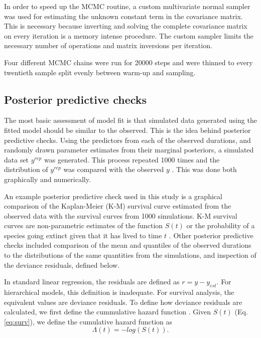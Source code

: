\documentclass[12pt,letterpaper]{article}
\begin{document}
In order to speed up the MCMC routine, a custom multivariate normal sampler was used for estimating the unknown constant term in the covariance matrix. This is necessary because inverting and solving the complete covariance matrix on every iteration is a memory intense procedure. The custom sampler limits the necessary number of operations and matrix inversions per iteration.

Four different MCMC chains were run for 20000 steps and were thinned to every twentieth sample split evenly between warm-up and sampling. 



\subsection{Posterior predictive checks}

The most basic assessment of model fit is that simulated data generated using the fitted model should be similar to the observed. This is the idea behind posterior predictive checks. Using the predictors from each of the observed durations, and randomly drawn parameter estimates from their marginal posteriors, a simulated data set \(y^{rep}\) was generated. This process repeated 1000 times and the distribution of \(y^{rep}\) was compared with the observed \(y\) \citep{Gelman2013d}. This was done both graphically and numerically.

An example posterior predictive check used in this study is a graphical comparison of the Kaplan-Meier (K-M) survival curve estimated from the observed data with the survival curves from 1000 simulations. K-M survival curves are non-parametric estimates of the function \(S(t)\) or the probability of a species going extinct given that it has lived to time \(t\) \citep{Klein2003}. Other posterior predictive checks included comparison of the mean and quantiles of the observed durations to the distributions of the same quantities from the simulations, and inspection of the deviance residuals, defined below.

In standard linear regression, the residuals are defined as \(r = y - y_{est}\). For hierarchical models, this definition is inadequate. For survival analysis, the equivalent values are deviance residuals. To define how deviance residuals are calculated, we first define the cummulative hazard function \citep{Klein2003}. Given \(S(t)\) (Eq. \ref{eq:surv}), we define the cumulative hazard function as 
\begin{equation*}
  \Lambda(t) = -log\left(S\left(t\right)\right).
\end{equation*}
\end{document}
